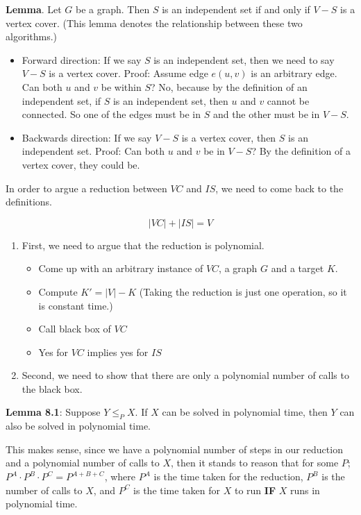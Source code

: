 \documentclass{article}
\begin{document}
\textbf{Lemma}. Let $G$ be a graph. Then $S$ is an independent set if and only if $V - S$ is a vertex cover. (This lemma denotes the relationship between these two algorithms.)

\begin{itemize}
    \item Forward direction: If we say $S$ is an independent set, then we need to say $V-S$ is a vertex cover. Proof: Assume edge $e(u, v)$ is an arbitrary edge. Can both $u$ and $v$ be within $S$? No, because by the definition of an independent set, if $S$ is an independent set, then $u$ and $v$ cannot be connected. So one of the edges must be in $S$ and the other must be in $V-S$.
    \item Backwards direction: If we say $V-S$ is a vertex cover, then $S$ is an independent set. Proof: Can both $u$ and $v$ be in $V - S$? By the definition of a vertex cover, they could be.
\end{itemize}

In order to argue a reduction between $VC$ and $IS$, we need to come back to the definitions.

$$|VC| + |IS| = V$$

\begin{enumerate}
    \item First, we need to argue that the reduction is polynomial.
    \begin{itemize}
        \item Come up with an arbitrary instance of $VC$, a graph $G$ and a target $K$.
        \item Compute $K' = |V| - K$ (Taking the reduction is just one operation, so it is constant time.)
        \item Call black box of $VC$
        \item Yes for $VC$ implies yes for $IS$
    \end{itemize}
    \item Second, we need to show that there are only a polynomial number of calls to the black box.
\end{enumerate}

\textbf{Lemma 8.1}: Suppose $Y \leq_{P} X$. If $X$ can be solved in polynomial time, then $Y$ can also be solved in polynomial time.

This makes sense, since we have a polynomial number of steps in our reduction and a polynomial number of calls to $X$, then it stands to reason that for some $P$; $P^A \cdot P^B \cdot P^C = P^{A + B + C}$, where $P^A$ is the time taken for the reduction, $P^B$ is the number of calls to $X$, and $P^C$ is the time taken for $X$ to run \textbf{IF} $X$ runs in polynomial time.
\end{document}

